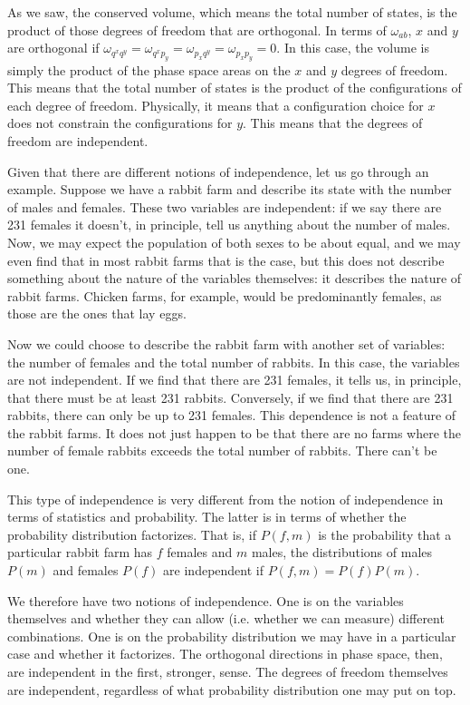 As we saw, the conserved volume, which means the total number of states, is the product of those degrees of freedom that are orthogonal. In terms of $\omega_{ab}$, $x$ and $y$ are orthogonal if $\omega_{q^x q^y} = \omega_{q^x p_y} = \omega_{p_x q^y} = \omega_{p_x p_y} = 0$. In this case, the volume is simply the product of the phase space areas on the $x$ and $y$ degrees of freedom. This means that the total number of states is the product of the configurations of each degree of freedom. Physically, it means that a configuration choice for $x$ does not constrain the configurations for $y$. This means that the degrees of freedom are independent.

Given that there are different notions of independence, let us go through an example. Suppose we have a rabbit farm and describe its state with the number of males and females. These two variables are independent: if we say there are 231 females it doesn't, in principle, tell us anything about the number of males. Now, we may expect the population of both sexes to be about equal, and we may even find that in most rabbit farms that is the case, but this does not describe something about the nature of the variables themselves: it describes the nature of rabbit farms. Chicken farms, for example, would be predominantly females, as those are the ones that lay eggs.

Now we could choose to describe the rabbit farm with another set of variables: the number of females and the total number of rabbits. In this case, the variables are not independent. If we find that there are 231 females, it tells us, in principle, that there must be at least 231 rabbits. Conversely, if we find that there are 231 rabbits, there can only be up to 231 females. This dependence is not a feature of the rabbit farms. It does not just happen to be that there are no farms where the number of female rabbits exceeds the total number of rabbits. There can't be one.

This type of independence is very different from the notion of independence in terms of statistics and probability. The latter is in terms of whether the probability distribution factorizes. That is, if $P(f,m)$ is the probability that a particular rabbit farm has $f$ females and $m$ males, the distributions of males $P(m)$ and females $P(f)$ are independent if $P(f,m) = P(f) P(m)$. 

We therefore have two notions of independence. One is on the variables themselves and whether they can allow (i.e. whether we can measure) different combinations. One is on the probability distribution we may have in a particular case and whether it factorizes. The orthogonal directions in phase space, then, are independent in the first, stronger, sense. The degrees of freedom themselves are independent, regardless of what probability distribution one may put on top.

